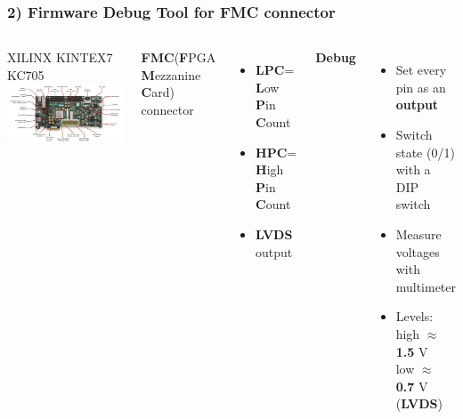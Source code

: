 \documentclass[aspectratio=169]{beamer}
\begin{document}
	\begin{frame}
		\frametitle{2) Firmware Debug Tool for FMC connector}
		\begin{columns}
			\begin{center}
				{\color{blue} XILINX KINTEX7 KC705}
				\includegraphics[width=1.0 \textwidth]{IMG/KC705.PNG}
			\end{center}
			\textbf{FMC}{\tiny (\textbf{F}PGA \textbf{M}ezzanine \textbf{C}ard)} connector
			\begin{itemize}
				\item \textbf{LPC}= \textbf{L}ow \textbf{P}in \textbf{C}ount
				\item \textbf{HPC}= \textbf{H}igh \textbf{P}in \textbf{C}ount
				\item \textbf{LVDS} output 
			\end{itemize}
			\textbf{Debug}
			\begin{itemize}
				\item Set every pin as an \textbf{output}
				\item Switch state (0/1) with a DIP switch
				\item Measure voltages with multimeter
				\item Levels: high $\approx$ \textbf{1.5} V \\ low $\approx$ \textbf{0.7} V (\textbf{LVDS})
			\end{itemize}
		\end{columns}
	\end{frame}
\end{document}
